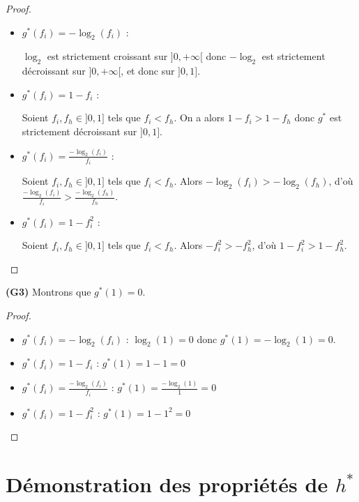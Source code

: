 \documentclass[a4paper]{article}
\begin{document}
\begin{proof}
\begin{itemize}

    \item $g^*(f_i) = -\log_{2}(f_i)$ :

        $\log_{2}$ est strictement croissant sur $]0, +\infty[$ donc $-\log_{2}$
        est strictement décroissant sur $]0,+\infty[$, et donc sur $]0,1]$.

    \item $g^*(f_i) = 1 - f_i$ : 
        
        Soient $f_i, f_h \in ]0,1]$ tels que $f_i < f_h$. On a alors $1 - f_i >
        1 - f_h$ donc $g^*$ est strictement décroissant sur $]0,1]$.

    \item $g^*(f_i) = \frac{-\log_{2}(f_i)}{f_i}$ :

        Soient $f_i, f_h \in ]0,1]$ tels que $f_i < f_h$. Alors $-\log_{2}(f_i) >
        -\log_{2}(f_h)$, d'où $\frac{-\log_{2}(f_i)}{f_i} >
        \frac{-\log_{2}(f_h)}{f_h}$.

    \item $g^*(f_i) = 1-f_i^2$ :

        Soient $f_i, f_h \in ]0,1]$ tels que $f_i < f_h$. Alors $-f_i^2 >
        -f_h^2$, d'où $1 - f_i^2 > 1 - f_h^2$. 

\end{itemize}
\end{proof}

\textbf{(G3)} Montrons que $g^*(1) = 0$.

\begin{proof}
\begin{itemize}

    \item $g^*(f_i) = -\log_{2}(f_i)$ :
        $\log_{2}(1) = 0$ donc $g^*(1) = -\log_{2}(1) = 0$.

    \item $g^*(f_i) = 1 - f_i$ : 
        $g^*(1) = 1 - 1 = 0$

    \item $g^*(f_i) = \frac{-\log_{2}(f_i)}{f_i}$ :
        $g^*(1) = \frac{-\log_{2}(1)}{1} = 0$

    \item $g^*(f_i) = 1-f_i^2$ :
        $g^*(1) = 1 - 1^2 = 0$

\end{itemize}
\end{proof}

\section{Démonstration des propriétés de $h^*$}
\label{appendix:demo-h}
\end{document}
